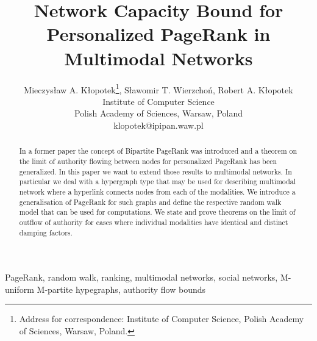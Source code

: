 \documentclass{fundam}
\begin{document}
\setcounter{page}{49}

\finalVersionForARXIV


\title{Network Capacity Bound for Personalized  PageRank in Multimodal Networks}

\author{Mieczys{\l}aw A. K{\l}opotek\thanks{Address for correspondence: Institute of Computer Science,
                  Polish Academy of Sciences, Warsaw, Poland.  \newline \newline
          },  S{\l}awomir  T. Wierzcho{\'n},
            Robert  A. K{\l}opotek
     \\
Institute of Computer Science \\
Polish Academy of Sciences, Warsaw, Poland\\
klopotek@ipipan.waw.pl
}


\maketitle






\begin{abstract}
\noindent
In a former paper \cite{Bipartite:2016}  the concept of Bipartite PageRank was introduced and a theorem on the limit of authority flowing between nodes for personalized PageRank has been generalized. In this paper we want to extend those results to multimodal networks.
In particular we deal with a hypergraph type that may be used for describing multimodal network where a hyperlink connects nodes from each of the modalities.
We introduce a generalisation of PageRank for such graphs and define the respective random walk model that can be used for computations.
We state and prove theorems on the limit of outflow of authority for cases where individual modalities have identical and distinct damping factors.
\end{abstract}

\begin{keywords}
PageRank, random walk, ranking, multimodal networks, social networks,  M-uniform M-partite hypegraphs, authority flow bounds
\end{keywords}
\end{document}
